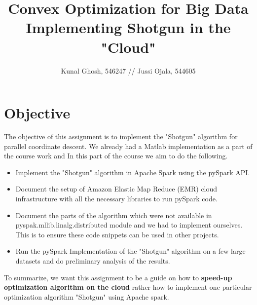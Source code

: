 \documentclass[a4paper,11pt]{article}
\begin{document}
\title{Convex Optimization for Big Data \\ Implementing Shotgun in the "Cloud"} %
\author{Kunal Ghosh, 546247 // Jussi Ojala, 544605} %
\maketitle

\section{Objective}\label{prob1}
The objective of this assignment is to implement the "Shotgun"
algorithm for parallel coordinate descent. We already had a Matlab
implementation as a part of the course work and In this part of the course we aim to do the following.
\begin{itemize}
    \item Implement the "Shotgun" algorithm in Apache Spark using the pySpark API.
    \item Document the setup of Amazon Elastic Map Reduce (EMR) cloud infrastructure with all the necessary libraries to run pySpark code.
    \item Document the parts of the algorithm which were not available in pyspak.mllib.linalg.distributed module and we had to implement ourselves. This is to ensure these code snippets can be used in other projects.
    \item Run the pySpark Implementation of the "Shotgun" algorithm on a few large datasets and do preliminary analysis of the results.
\end{itemize}
To summarize, we want this assignment to be a guide on how to \textbf{speed-up optimization algorithm on the cloud} rather how to implement one particular optimization algorithm "Shotgun" using Apache spark.
\end{document}
